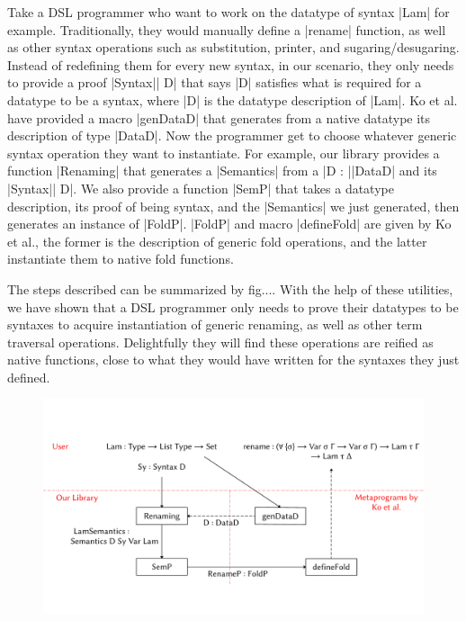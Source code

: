 \documentclass[sigplan,review,fleqn]{acmart}
\renewcommand{\verb}{\collectverb{\color{AgdaFunction}}}
\newcommand{\macro}{\collectverb{\color{AgdaMacro}}}
\newcommand{\name}{\collectverb{\color{AgdaSymbol}}}
\begin{document}
Take a DSL programmer who want to work on the datatype of syntax \verb|Lam| for example.
Traditionally, they would manually define a \verb|rename| function, as well as other syntax operations such as substitution, printer, and sugaring/desugaring.
Instead of redefining them for every new syntax, in our scenario, they only needs to provide a proof \verb|Syntax|\name| D| that says \name|D| satisfies what is required for a datatype to be a syntax, where \name|D| is the datatype description of \verb|Lam|. 
Ko et al. have provided a macro \macro|genDataD| that generates from a native datatype its description of type \verb|DataD|.
Now the programmer get to choose whatever generic syntax operation they want to instantiate.
For example, our library provides a function \verb|Renaming| that generates a \verb|Semantics| from a \name|D : |\verb|DataD| and its \verb|Syntax|\name| D|. 
We also provide a function \verb|SemP| that takes a datatype description, its proof of being syntax, and the \verb|Semantics| we just generated, then generates an instance of \verb|FoldP|.
\verb|FoldP| and macro \macro|defineFold| are given by Ko et al., the former is the description of generic fold operations, and the latter instantiate them to native fold functions.

The steps described can be summarized by fig....
With the help of these utilities, we have shown that a DSL programmer only needs to prove their datatypes to be syntaxes to acquire instantiation of generic renaming, as well as other term traversal operations.
Delightfully they will find these operations are reified as native functions, close to what they would have written for the syntaxes they just defined.

\begin{figure}
	\centering
	\includegraphics[width=\textwidth]{Diagram}
\end{figure}
\end{document}
